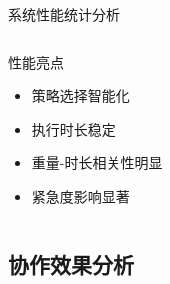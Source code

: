 \documentclass[
10pt,
aspectratio=169,
]{beamer}
\begin{document}
\begin{frame}{系统性能统计分析}
\begin{columns}
\begin{column}{0.4\textwidth}
            \begin{alertblock}{性能亮点}
                \begin{itemize}
                    \item 策略选择智能化
                    \item 执行时长稳定
                    \item 重量-时长相关性明显
                    \item 紧急度影响显著
                \end{itemize}
            \end{alertblock}
        \end{column}
    \end{columns}
\end{frame}

\subsection{协作效果分析}
\end{document}
